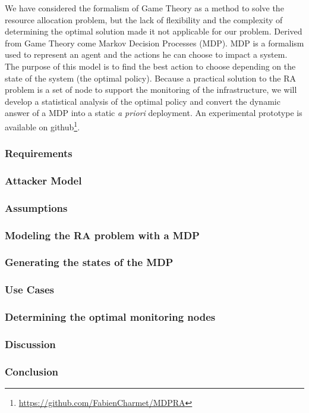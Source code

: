 We have considered the formalism of Game Theory as a method to solve the resource allocation problem, but the lack of flexibility and the complexity of determining the optimal solution made it not applicable for our problem. Derived from Game Theory come Markov Decision Processes (MDP).
MDP is a formalism used to represent an agent and the actions he can choose to impact a system. The purpose of this model is to find the best action to choose depending on the state of the system (\ie the optimal policy). Because a practical solution to the RA problem is a set of node to support the monitoring of the infrastructure, we will develop a statistical analysis of the optimal policy and convert the dynamic answer of a MDP into a static \textit{a priori} deployment.
An experimental prototype is available on github\footnote{\label{github}\url{https://github.com/FabienCharmet/MDPRA}}.

\subsubsection{Requirements}




\subsubsection{Attacker Model}


\subsubsection{Assumptions}


\subsubsection{Modeling the RA problem with a MDP}


\newpage
\subsubsection{Generating the states of the MDP}
 

\newpage
\subsubsection{Use Cases}


\subsubsection{Determining the optimal monitoring nodes}


\subsubsection{Discussion}


\subsubsection{Conclusion}
